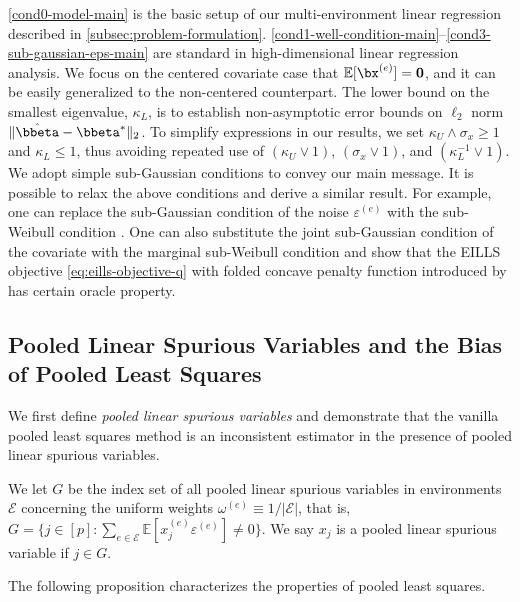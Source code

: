 \documentclass[10pt]{article}
\numberwithin{equation}{section}
\begin{document}
{\cref{cond0-model-main} is the basic setup of our multi-environment linear regression described in \cref{subsec:problem-formulation}. \cref{cond1-well-condition-main}--\ref{cond3-sub-gaussian-eps-main} are standard in high-dimensional linear regression analysis. We focus on the centered covariate case that $\mathbb{E}[\bx^{(e)}] = \bm{0}$, and it can be easily generalized to the non-centered counterpart.  The lower bound on the smallest eigenvalue, $\kappa_L$, is to establish non-asymptotic error bounds on $\ell_2$ norm $\|\hat{\bbeta}-\bbeta^*\|_2$. To simplify expressions in our results, we set $\kappa_U \land \sigma_x \ge 1$ and $\kappa_L \le 1$, thus avoiding repeated use of $(\kappa_U \lor 1)$, $(\sigma_x \lor 1)$, and $(\kappa_L^{-1} \lor 1)$. We adopt simple sub-Gaussian conditions to convey our main message. It is possible to relax the above conditions and derive a similar result. For example, one can replace the sub-Gaussian condition of the noise $\varepsilon^{(e)}$ with the sub-Weibull condition \citep{vladimirova2020sub}. One can also substitute the joint sub-Gaussian condition of the covariate with the marginal sub-Weibull condition and show that the EILLS objective \eqref{eq:eills-objective-q} with folded concave penalty function introduced by \cite{fan2001variable} has certain oracle property.

\subsection{Pooled Linear Spurious Variables and the Bias of Pooled Least Squares}
\label{subsec:linear-spurious-variable}

We first define \emph{pooled linear spurious variables} and demonstrate that the vanilla pooled least squares method is an inconsistent estimator in the presence of pooled linear spurious variables.

\begin{definition} We let $G$ be the index set of all pooled linear spurious variables in environments $\mathcal{E}$ concerning the uniform weights $\omega^{(e)}\equiv 1/|\mathcal{E}|$, that is,
        $G = \{j \in [p]:  \sum_{e\in \mathcal{E}} \mathbb{E}[x_j^{(e)}\varepsilon^{(e)}] \neq 0 \}$. We say $x_j$ is a pooled linear spurious variable if $j\in G$.
\end{definition}


The following proposition characterizes the properties of pooled least squares.

}
\end{document}
